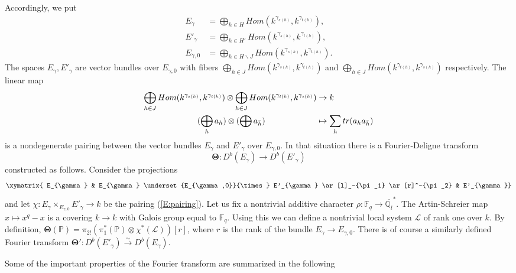 \documentclass[a4paper,10pt]{amsart}
\def\qlb{\overline{\mathbb{Q}_l}}
\def\FD{\boldsymbol{\Theta}}
\numberwithin{equation}{section}
\begin{document}
\vspace{-.2in}


Accordingly, we put
\begin{align*}
E_{\gamma}&=\bigoplus_{h \in H} Hom(k^{\gamma_{s(h)}},k^{\gamma_{t(h)}}),\\
E'_{\gamma}&=\bigoplus_{h \in H'} Hom(k^{\gamma_{s(h)}},k^{\gamma_{t(h)}}),\\
E_{\gamma,0}&=\bigoplus_{h \in H \backslash J} Hom(k^{\gamma_{s(h)}},k^{\gamma_{t(h)}}).
\end{align*}
The spaces $E_{\gamma}, E'_{\gamma}$ are vector bundles over $E_{\gamma,0}$ with fibers $\bigoplus_{h \in J} Hom(k^{\gamma_{s(h)}},k^{\gamma_{t(h)}})$ and $\bigoplus_{h \in J} Hom(k^{\gamma_{t(h)}},k^{\gamma_{s(h)}})$ respectively. The linear map
\begin{equation}\label{E:pairing}
\begin{split}
\bigoplus_{h \in J} Hom(k^{\gamma_{s(h)}},k^{\gamma_{t(h)}}) \otimes \bigoplus_{h \in J} Hom(k^{\gamma_{t(h)}},k^{\gamma_{s(h)}}) & \to k\\
(\bigoplus_h a_h) \otimes (\bigoplus {a}_{\bar{h}}) \hspace{.86in} & \mapsto \sum_h tr(a_h a_{\bar{h}})
\end{split}
\end{equation}
is a nondegenerate pairing between the vector bundles $E_{\gamma}$ and $E'_{\gamma}$ over $E_{\gamma,0}$. In that situation there is a Fourier-Deligne transform
$$\FD: D^b(E_\gamma) {\to} D^b(E'_{\gamma})$$
constructed as follows. Consider the projections
$$\xymatrix{ E_{\gamma} & E_{\gamma} \underset{E_{\gamma,0}}{\times} E'_{\gamma} \ar[l]_-{\pi_1} \ar[r]^-{\pi_2} & E'_{\gamma}}$$
and let $\chi: E_{\gamma} \times_{E_{\gamma,0}} E'_{\gamma} \to k$ be the pairing (\ref{E:pairing}).
Let us fix a nontrivial additive character $\rho: \mathbb{F}_q \to \qlb^*$. The Artin-Schreier map $x \mapsto x^q-x$ is a covering $k \to k$ with Galois group equal to $\mathbb{F}_q$. Using this we can define a nontrivial local system $\mathcal{L}$ of rank one over $k$. By definition, $\FD(\mathbb{P})=\pi_{2!}( \pi_1^*(\mathbb{P}) \otimes \chi^* (\mathcal{L}))[r]$, where $r$ is the rank of the bundle $E_{\gamma} \to E_{\gamma,0}$. There is of course a similarly defined Fourier transform
$\FD':  D^b(E'_\gamma) \stackrel{\sim}{\to} D^b(E_{\gamma})$. 

\vspace{.1in}

Some of the important properties of the Fourier transform are summarized in the following~
\end{document}
